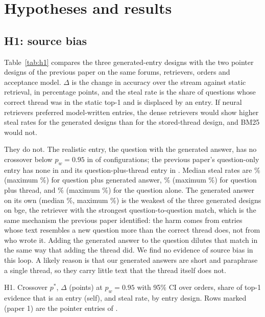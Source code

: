 \documentclass[11pt]{article}
\begin{document}
\section{Hypotheses and results}
\subsection{H1: source bias}
Table~\ref{tab:h1} compares the three generated-entry designs with the two pointer designs of the previous paper on the same forums, retrievers, orders and acceptance model. $\Delta$ is the change in accuracy over the stream against static retrieval, in percentage points, and the steal rate is the share of questions whose correct thread was in the static top-1 and is displaced by an entry. If neural retrievers preferred model-written entries, the dense retrievers would show higher steal rates for the generated designs than for the stored-thread design, and BM25 would not.

They do not. The realistic entry, the question with the generated answer, has no crossover below $p_w=0.95$ in \nSafeAskGen{} of \nConfigs{} configurations; the previous paper's question-only entry has none in \nSafePOneAsk{} and its question-plus-thread entry in \nSafePOneAskDoc{}. Median steal rates are \stealMedAskGen{}\% (maximum \stealMaxAskGen{}\%) for question plus generated answer, \stealMedPOneAskDoc{}\% (maximum \stealMaxPOneAskDoc{}\%) for question plus thread, and \stealMedPOneAsk{}\% (maximum \stealMaxPOneAsk{}\%) for the question alone. The generated answer on its own (median \stealMedGen{}\%, maximum \stealMaxGen{}\%) is the weakest of the three generated designs on bge, the retriever with the strongest question-to-question match, which is the same mechanism the previous paper identified: the harm comes from entries whose text resembles a new question more than the correct thread does, not from who wrote it. Adding the generated answer to the question dilutes that match in the same way that adding the thread did. We find no evidence of source bias in this loop. A likely reason is that our generated answers are short and paraphrase a single thread, so they carry little text that the thread itself does not.

\begin{table}[t]\centering\small
\caption{H1. Crossover $p^*$, $\Delta$ (points) at $p_w=0.95$ with 95\% CI over orders, share of top-1 evidence that is an entry (self), and steal rate, by entry design. Rows marked (paper 1) are the pointer entries of \citet{guthikonda2026accepted}.}\label{tab:h1}
\begin{adjustbox}{max width=\linewidth, max totalheight=0.85\textheight}\end{adjustbox}
\end{table}
\end{document}
